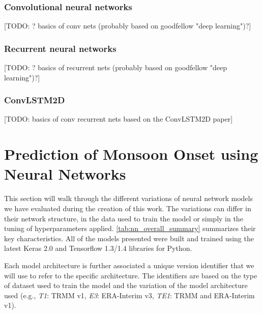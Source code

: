 \subsubsection{Convolutional neural networks}
\label{sst:convolutional_networks}
[TODO: ? basics of conv nets (probably based on goodfellow "deep learning")?]

\subsubsection{Recurrent neural networks}
\label{sst:recurrent_networks}
[TODO: ? basics of recurrent nets (probably based on goodfellow "deep learning")?]

\subsubsection{ConvLSTM2D}
[TODO: basics of conv recurrent nets based on the ConvLSTM2D paper]


\clearpage
\section{Prediction of Monsoon Onset using Neural Networks}
\label{st:nn_implementation}
This section will walk through the different variations of neural network models we have evaluated during the creation of this work. The variations can differ in their network structure, in the data used to train the model or simply in the tuning of hyperparameters applied. \cref{tab:nn_overall_summary} summarizes their key characteristics. All of the models presented were built and trained using the latest Keras 2.0 and Tensorflow 1.3/1.4 libraries for Python.

Each model architecture is further associated a unique version identifier that we will use to refer to the specific architecture. The identifiers are based on the type of dataset used to train the model and the variation of the model architecture used (e.g., \textit{T1}: TRMM v1, \textit{E3}: ERA-Interim v3, \textit{TE1}: TRMM and ERA-Interim v1).

